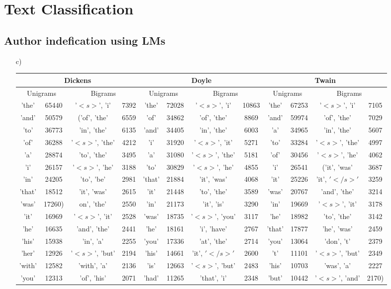 \documentclass{article}
\begin{document}

\setcounter{section}{1}
\section{Text Classification}
\subsection{Author indefication using LMs}
\begin{itemize}
\item[c)]
\begin{table}[h]
\begin{adjustbox}{width=\columnwidth,center}
\begin{tabular}{|c c| c c|| c c| c c|| c c| c c |}
	\hline
	\multicolumn{4}{|c||}{Dickens}&\multicolumn{4}{c||}{Doyle}&\multicolumn{4}{c|}{Twain}\\\hline
	\multicolumn{2}{|c|}{Unigrams}&\multicolumn{2}{c||}{Bigrams}&\multicolumn{2}{c|}{Unigrams}&\multicolumn{2}{c||}{Bigrams}&\multicolumn{2}{|c|}{Unigrams}&\multicolumn{2}{c|}{Bigrams}\\\hline
	'the'& 65440&'$<s>$', 'i'& 7392&'the'& 72028&'$<s>$', 'i'& 10863&'the'& 67253&'$<s>$', 'i'& 7105\\
	'and'& 50579&('of', 'the'& 6559&'of'& 34862&'of', 'the'& 8869&'and'& 59974&'of', 'the'& 7029\\
	'to'& 36773&'in', 'the'& 6135&'and'& 34405&'in', 'the'& 6003&'a'& 34965&'in', 'the'& 5607\\
	'of'& 36288&'$<s>$', 'the'& 4212&'i'& 31920&'$<s>$', 'it'& 5271&'to'& 33284&'$<s>$', 'the'& 4997\\
	'a'& 28874&'to', 'the'& 3495&'a'& 31080&'$<s>$', 'the'& 5181&'of'& 30456&'$<s>$', 'he'& 4062\\
	'i'& 26157&'$<s>$', 'he'& 3188&'to'& 30829&'$<s>$', 'he'& 4855&'i'& 26541&('it', 'was'& 3687\\
	'in'& 24205&'to', 'be'& 2981&'that'& 21884&'it', 'was'& 4068&'it'& 25226&'it', $'</s>'$& 3259\\
	'that'& 18512&'it', 'was'& 2615&'it'& 21448&'to', 'the'& 3589&'was'& 20767&'and', 'the'& 3214\\
	'was'&17260)&on', 'the'& 2550&'in'& 21173&'it', 'is'& 3290&'in'& 19669&'$<s>$', 'it'& 3178\\
	'it'& 16969&'$<s>$', 'it'& 2528&'was'& 18735&'$<s>$', 'you'& 3117&'he'& 18982&'to', 'the'& 3142\\
	'he'& 16635&'and', 'the'& 2441&'he'& 18161&'i', 'have'& 2767&'that'& 17877&'he', 'was'& 2459\\
	'his'& 15938&'in', 'a'& 2255&'you'& 17336&'at', 'the'& 2714&'you'& 13064&'don', 't'& 2379\\
	'her'& 12926&'$<s>$', 'but'& 2194&'his'& 14661&'it', $'</s>'$& 2600&'t'& 11101&'$<s>$', 'but'& 2349\\
	'with'& 12582&'with', 'a'& 2136&'is'& 12663&'$<s>$', 'but'& 2483&'his'& 10703&'was', 'a'& 2227\\
	'you'& 12313&'of', 'his'& 2071&'had'& 11265&'that', 'i'& 2348&'but'& 10442&'$<s>$', 'and'& 2170)\\\hline




\end{tabular}
\end{adjustbox}
\end{table}
\end{itemize}
\end{document}

